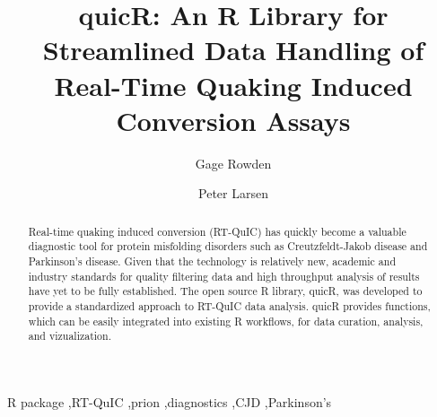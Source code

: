 \documentclass[preprint,12pt, a4paper]{elsarticle}
\begin{document}
\renewcommand{\labelenumii}{\arabic{enumi}.\arabic{enumii}}

\begin{frontmatter}

 


\title{quicR: An R Library for Streamlined Data Handling of Real-Time Quaking Induced Conversion Assays}

\author[label1,label2,label3]{Gage Rowden}
\author[label1,label2,label3]{Peter Larsen}
\address[label1]{Department of Veterinary and Biomedical Sciences, University of Minnesota, USA.}
\address[label2]{Minnesota Center for Prion Research and Outreach, University of Minnesota, USA.}
\address[label3]{Priogen Corp., USA.}

\begin{abstract}
Real-time quaking induced conversion (RT-QuIC) has quickly become a valuable diagnostic tool for protein misfolding disorders such as Creutzfeldt-Jakob disease and Parkinson's disease. Given that the technology is relatively new, academic and industry standards for quality filtering data and high throughput analysis of results have yet to be fully established. The open source R library, quicR, was developed to provide a standardized approach to RT-QuIC data analysis. quicR provides functions, which can be easily integrated into existing R workflows, for data curation, analysis, and vizualization.
\end{abstract}

\begin{keyword}
R package \sep RT-QuIC \sep prion \sep diagnostics \sep CJD \sep Parkinson's



\end{keyword}

\end{frontmatter}
\end{document}
